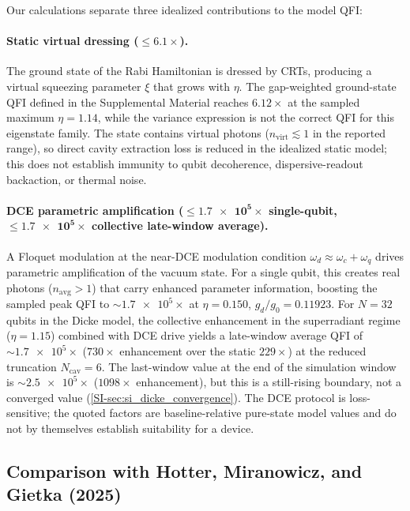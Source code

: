 \documentclass[aps,prxquantum,preprint,superscriptaddress,amsmath,amssymb]{revtex4-2}
\begin{document}
Our calculations separate three idealized contributions to the model QFI:

\paragraph{Static virtual dressing ($\boldsymbol{\le \num{6.1}}\times$).} The ground state of the Rabi Hamiltonian is dressed by CRTs, producing a virtual squeezing parameter $\xi$ that grows with $\eta$. The gap-weighted ground-state QFI defined in the Supplemental Material reaches $\num{6.12}\times$ at the sampled maximum $\eta=\num{1.14}$, while the variance expression is not the correct QFI for this eigenstate family. The state contains virtual photons ($n_{\text{virt}}\lesssim\num{1}$ in the reported range), so direct cavity extraction loss is reduced in the idealized static model; this does not establish immunity to qubit decoherence, dispersive-readout backaction, or thermal noise.

\paragraph{DCE parametric amplification ($\boldsymbol{\le \num{1.7e5}}\times$ single-qubit, $\boldsymbol{\le \num{1.7e5}}\times$ collective late-window average).} A Floquet modulation at the near-DCE modulation condition $\omega_d \approx \omega_c + \omega_q$ drives parametric amplification of the vacuum state. For a single qubit, this creates real photons ($n_{\text{avg}} > \num{1}$) that carry enhanced parameter information, boosting the sampled peak QFI to $\sim\!\num{1.7e5}\times$ at $\eta=\num{0.150}$, $g_d/g_0=\num{0.11923}$. For $N=\num{32}$ qubits in the Dicke model, the collective enhancement in the superradiant regime ($\eta=\num{1.15}$) combined with DCE drive yields a late-window average QFI of $\sim\!\num{1.7e5}\times$ ($\num{730}\times$ enhancement over the static $\num{229}\times$) at the reduced truncation $N_{\text{cav}}=\num{6}$. The last-window value at the end of the simulation window is $\sim\!\num{2.5e5}\times$ ($\num{1098}\times$ enhancement), but this is a still-rising boundary, not a converged value (\cref{SI-sec:si_dicke_convergence}). The DCE protocol is loss-sensitive; the quoted factors are baseline-relative pure-state model values and do not by themselves establish suitability for a device.

\subsection{Comparison with Hotter, Miranowicz, and Gietka (2025)}
\end{document}
